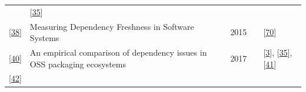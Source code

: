 \documentclass[]{book}
\begin{document}
\begin{longtable}[]{@{}lllll@{}}
\begin{minipage}[t]{0.24\columnwidth}
\strut
\end{minipage} & \begin{minipage}[t]{0.16\columnwidth}\raggedright\strut
{[}\protect\hyperlink{ref-Constantinou2017}{35}{]}\strut
\end{minipage}\tabularnewline
\begin{minipage}[t]{0.12\columnwidth}\raggedright\strut
{[}\protect\hyperlink{ref-Cox2015}{38}{]}\strut
\end{minipage} & \begin{minipage}[t]{0.31\columnwidth}\raggedright\strut
Measuring Dependency Freshness in Software Systems\strut
\end{minipage} & \begin{minipage}[t]{0.02\columnwidth}\raggedright\strut
2015\strut
\end{minipage} & \begin{minipage}[t]{0.24\columnwidth}\raggedright\strut
\strut
\end{minipage} & \begin{minipage}[t]{0.16\columnwidth}\raggedright\strut
{[}\protect\hyperlink{ref-Kikas2017}{70}{]}\strut
\end{minipage}\tabularnewline
\begin{minipage}[t]{0.12\columnwidth}\raggedright\strut
{[}\protect\hyperlink{ref-Decan2017}{40}{]}\strut
\end{minipage} & \begin{minipage}[t]{0.31\columnwidth}\raggedright\strut
An empirical comparison of dependency issues in OSS packaging
ecosystems\strut
\end{minipage} & \begin{minipage}[t]{0.02\columnwidth}\raggedright\strut
2017\strut
\end{minipage} & \begin{minipage}[t]{0.24\columnwidth}\raggedright\strut
\strut
\end{minipage} & \begin{minipage}[t]{0.16\columnwidth}\raggedright\strut
{[}\protect\hyperlink{ref-Abdalkareem2017}{3}{]},
{[}\protect\hyperlink{ref-Constantinou2017}{35}{]},
{[}\protect\hyperlink{ref-Decan2018}{41}{]}\strut
\end{minipage}\tabularnewline
\begin{minipage}[t]{0.12\columnwidth}\raggedright\strut
{[}\protect\hyperlink{ref-Dietrich2014}{42}{]}\strut
\end{minipage} & \begin{minipage}[t]{0.31\columnwidth}\raggedright\strut

\end{minipage}
\end{longtable}
\end{document}
